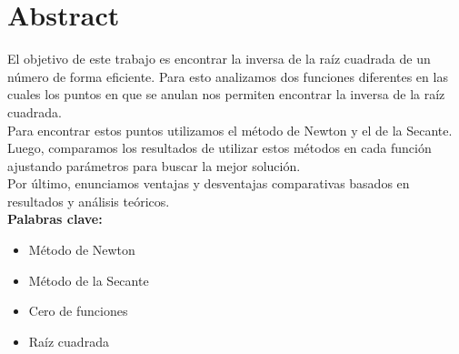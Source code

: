 \section{Abstract}

El objetivo de este trabajo es encontrar la inversa de la raíz cuadrada de un
número de forma eficiente. Para esto analizamos dos funciones diferentes en las
cuales los puntos en que se anulan nos permiten encontrar la inversa de la raíz
cuadrada.\\

Para encontrar estos puntos utilizamos el método de Newton y el de la Secante.
Luego, comparamos los resultados de utilizar estos métodos en cada función
ajustando parámetros para buscar la mejor solución.\\

Por último, enunciamos ventajas y desventajas comparativas basados en
resultados y análisis teóricos.\\

{\bf Palabras clave:}
\begin{itemize}
    \item Método de Newton
    \item Método de la Secante
    \item Cero de funciones
    \item Raíz cuadrada
\end{itemize}
